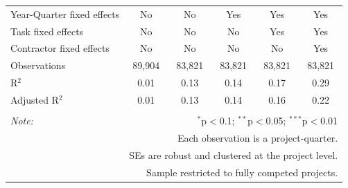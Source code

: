 \documentclass[
]{article}
\begin{document}
\begin{table}[H]
\begin{tabular}{@{\extracolsep{-2pt}}lccccc}
Year-Quarter fixed effects & No & No & Yes & Yes & Yes \\ 
Task fixed effects & No & No & No & Yes & Yes \\ 
Contractor fixed effects & No & No & No & No & Yes \\ 
Observations & 89,904 & 83,821 & 83,821 & 83,821 & 83,821 \\ 
R$^{2}$ & 0.01 & 0.13 & 0.14 & 0.17 & 0.29 \\ 
Adjusted R$^{2}$ & 0.01 & 0.13 & 0.14 & 0.16 & 0.22 \\ 
\hline 
\hline \\[-1.8ex] 
\textit{Note:}  & \multicolumn{5}{r}{$^{*}$p$<$0.1; $^{**}$p$<$0.05; $^{***}$p$<$0.01} \\ 
 & \multicolumn{5}{r}{Each observation is a project-quarter.} \\ 
 & \multicolumn{5}{r}{SEs are robust and clustered at the project level.} \\ 
 & \multicolumn{5}{r}{Sample restricted to fully competed projects.} \\ 
\end{tabular} 
\end{table}
\end{document}
